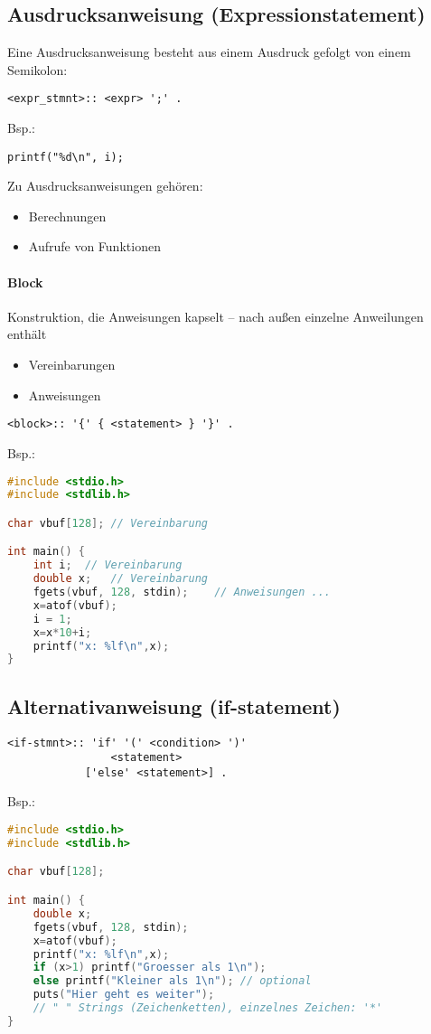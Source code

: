 \subsection[Ausdrucksanweisung]{Ausdrucksanweisung (Expressionstatement)}
Eine Ausdrucksanweisung besteht aus einem Ausdruck gefolgt von einem Semikolon:
\begin{lstlisting}
<expr_stmnt>:: <expr> ';' .
\end{lstlisting}

Bsp.:
\begin{lstlisting}
printf("%d\n", i);
\end{lstlisting}
Zu Ausdrucksanweisungen gehören:
\begin{itemize}
\item Berechnungen
\item Aufrufe von Funktionen
\end{itemize}
\paragraph{Block}
Konstruktion, die Anweisungen kapselt -- nach außen einzelne Anweilungen enthält
\begin{itemize}
\item Vereinbarungen
\item Anweisungen
\end{itemize}
\begin{lstlisting}
<block>:: '{' { <statement> } '}' .
\end{lstlisting}

Bsp.:
\begin{lstlisting}[language=C]
#include <stdio.h>
#include <stdlib.h>

char vbuf[128];	// Vereinbarung

int main() {
	int i;	// Vereinbarung
	double x;	// Vereinbarung
	fgets(vbuf, 128, stdin);	// Anweisungen ...
	x=atof(vbuf);
	i = 1;
	x=x*10+i;
	printf("x: %lf\n",x);
}
\end{lstlisting}

\subsection[Alternativanweisung]{Alternativanweisung (if-statement)}

\begin{lstlisting}
<if-stmnt>:: 'if' '(' <condition> ')' 
				<statement>
			['else' <statement>] .
\end{lstlisting}

Bsp.:
\begin{lstlisting}[language=C]
#include <stdio.h>
#include <stdlib.h>

char vbuf[128];

int main() {
	double x;
	fgets(vbuf, 128, stdin);
	x=atof(vbuf);
	printf("x: %lf\n",x);
	if (x>1) printf("Groesser als 1\n");
	else printf("Kleiner als 1\n");	// optional
	puts("Hier geht es weiter");	
	// " " Strings (Zeichenketten), einzelnes Zeichen: '*'
}
\end{lstlisting}

